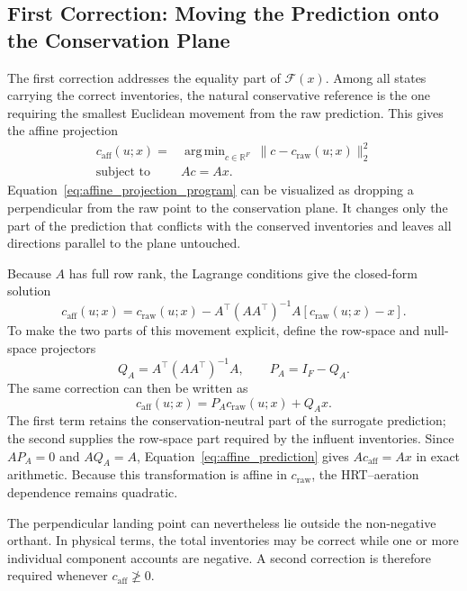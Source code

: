 \documentclass[a4paper,fleqn]{cas-sc}
\DeclareMathOperator*{\argminop}{arg\,min}
\newcommand{\R}{\mathbb{R}}
\begin{document}
\subsection{First Correction: Moving the Prediction onto the Conservation Plane}

The first correction addresses the equality part of $\mathcal F(x)$. Among all states carrying the correct inventories, the natural conservative reference is the one requiring the smallest Euclidean movement from the raw prediction. This gives the affine projection
\begin{equation}
\label{eq:affine_projection_program}
\begin{aligned}
c_{\mathrm{aff}}(u;x)={}&
\argminop_{c\in\R^F}\ \|c-c_{\mathrm{raw}}(u;x)\|_2^2\\
\text{subject to}\quad {}&Ac=Ax.
\end{aligned}
\end{equation}
Equation~\eqref{eq:affine_projection_program} can be visualized as dropping a perpendicular from the raw point to the conservation plane. It changes only the part of the prediction that conflicts with the conserved inventories and leaves all directions parallel to the plane untouched.

Because $A$ has full row rank, the Lagrange conditions give the closed-form solution
\begin{equation}
\label{eq:affine_closed_form}
c_{\mathrm{aff}}(u;x)
=c_{\mathrm{raw}}(u;x)
-A^\top(AA^\top)^{-1}A[c_{\mathrm{raw}}(u;x)-x].
\end{equation}
To make the two parts of this movement explicit, define the row-space and null-space projectors
\begin{equation}
\label{eq:projectors}
Q_A=A^\top(AA^\top)^{-1}A,
\qquad
P_A=I_F-Q_A.
\end{equation}
The same correction can then be written as
\begin{equation}
\label{eq:affine_prediction}
c_{\mathrm{aff}}(u;x)=P_Ac_{\mathrm{raw}}(u;x)+Q_Ax.
\end{equation}
The first term retains the conservation-neutral part of the surrogate prediction; the second supplies the row-space part required by the influent inventories. Since $AP_A=0$ and $AQ_A=A$, Equation~\eqref{eq:affine_prediction} gives $Ac_{\mathrm{aff}}=Ax$ in exact arithmetic. Because this transformation is affine in $c_{\mathrm{raw}}$, the HRT--aeration dependence remains quadratic.

The perpendicular landing point can nevertheless lie outside the non-negative orthant. In physical terms, the total inventories may be correct while one or more individual component accounts are negative. A second correction is therefore required whenever $c_{\mathrm{aff}}\not\geq0$.
\end{document}
